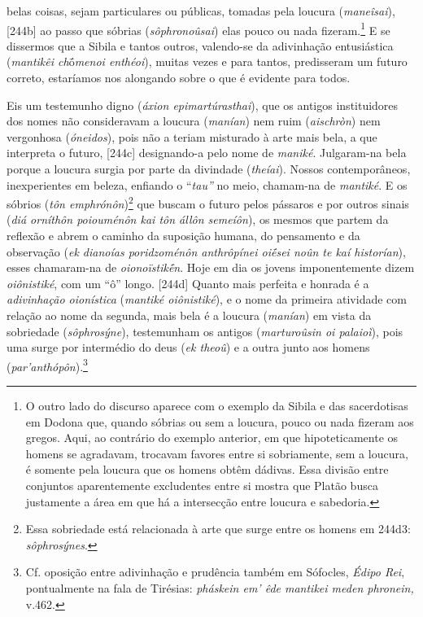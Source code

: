 belas coisas, sejam particulares ou públicas, tomadas pela loucura
(\emph{maneîsai}), {[}244b{]} ao passo que sóbrias (\emph{sôphronoûsai})
elas pouco ou nada fizeram.\footnote{O outro lado do discurso aparece
  com o exemplo da Sibila e das sacerdotisas em Dodona que, quando
  sóbrias ou sem a loucura, pouco ou nada fizeram aos gregos. Aqui, ao
  contrário do exemplo anterior, em que hipoteticamente os homens se
  agradavam, trocavam favores entre si sobriamente, sem a loucura, é
  somente pela loucura que os homens obtêm dádivas. Essa divisão entre
  conjuntos aparentemente excludentes entre si mostra que Platão busca
  justamente a área em que há a intersecção entre loucura e sabedoria.}
E se dissermos que a Sibila e tantos outros, valendo-se da adivinhação
entusiástica (\emph{mantikêi ch}ṓ\emph{menoi enthéoi}), muitas vezes e
para tantos, predisseram um futuro correto, estaríamos nos alongando
sobre o que é evidente para todos.

Eis um testemunho digno (\emph{áxion epimartúrasthai}), que os antigos
instituidores dos nomes não consideravam a loucura (\emph{manían}) nem
ruim (\emph{aischròn}) nem vergonhosa (\emph{óneidos}), pois não a
teriam misturado à arte mais bela, a que interpreta o futuro, {[}244c{]}
designando-a pelo nome de \emph{maniké}. Julgaram-na bela porque a
loucura surgia por parte da divindade (\emph{theíai}). Nossos
contemporâneos, inexperientes em beleza, enfiando o ``\emph{tau''} no
meio, chamam-na de \emph{mantiké}. E os sóbrios (\emph{tôn
emphrónôn})\footnote{Essa sobriedade está relacionada à arte que surge
  entre os homens em 244d3: \emph{sôphrosýnes}.} que buscam o futuro
pelos pássaros e por outros sinais (\emph{diá orníthôn poiouménôn kai
tôn állôn semeíôn}), os mesmos que partem da reflexão e abrem o caminho
da suposição humana, do pensamento e da observação (\emph{ek dianoías
poridzoménôn anthrôpínei oiḗsei noûn te kaí historían}), esses
chamaram-na de \emph{oionoïstikḗn}. Hoje em dia os jovens imponentemente
dizem \emph{oiônistiké}, com um ``ô'' longo. {[}244d{]} Quanto mais
perfeita e honrada é a \emph{adivinhação oionística} (\emph{mantiké
oiônistiké}), e o nome da primeira atividade com relação ao nome da
segunda, mais bela é a loucura (\emph{manían}) em vista da sobriedade
(\emph{sôphrosýne}), testemunham os antigos (\emph{marturoûsin oi
palaioì}), pois uma surge por intermédio do deus (\emph{ek theoû}) e a
outra junto aos homens (\emph{par'anthópôn}).\footnote{Cf. oposição
  entre adivinhação e prudência também em Sófocles, \emph{Édipo Rei},
  pontualmente na fala de Tirésias: \emph{pháskein em' êde mantikei
  meden phronein,} v.462.}

